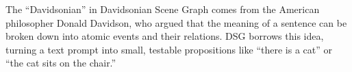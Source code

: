 \clearpage

\thispagestyle{customstyle}

{The “Davidsonian” in Davidsonian Scene Graph comes from the American philosopher Donald Davidson, who argued that the meaning of a sentence can
be broken down into atomic events and their relations. DSG borrows this idea, turning a text prompt into small, testable propositions like
“there is a cat” or “the cat sits on the chair.”}